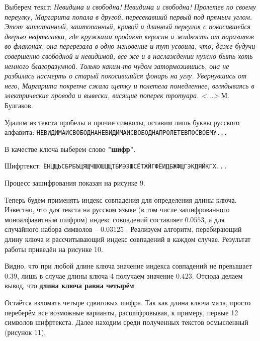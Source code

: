 Выберем текст: \textit{Невидима и свободна! Невидима и свободна! Пролетев по своему переулку, Маргарита попала в другой, пересекавший первый под прямым углом. Этот заплатанный, заштопанный, кривой и длинный переулок с покосившейся дверью нефтелавки, где кружками продают керосин и жидкость от паразитов во флаконах, она перерезала в одно мгновение и тут усвоила, что, даже будучи совершенно свободной и невидимой, все же и в наслаждении нужно быть хоть немного благоразумной. Только каким-то чудом затормозившись, она не разбилась насмерть о старый покосившийся фонарь на углу. Увернувшись от него, Маргарита покрепче сжала щетку и полетела помедленнее, вглядываясь в электрические провода и вывески, висящие поперек тротуара. <...>} М. Булгаков.

Удалим из текста пробелы и прочие символы, оставим лишь буквы русского алфавита: 
\verb|НЕВИДИМАИСВОБОДНАНЕВИДИМАИСВОБОДНАПРОЛЕТЕВПОСВОЕМУ...| 

В качестве ключа выберем слово {\bf "шифр"}. 

Шифртекст: \verb|ЁНЦЩЬСБРБЪЦЯЩЧШЮШЦЩТБМЭЭШСЁТЖЙГФЁИДБЖФЩГЭКДЯЙКГХ...|

Процесс зашифрования показан на рисунке 9.

Теперь будем применять индекс совпадения для определения длины ключа. Известно, что для текста на русском языке (в том числе зашифрованного моноалфавитным шифром) индекс совпадений составляет $0.0553$, а для случайного набора символов – $0.03125$ \cite{wiki:index_of_coincidence}. Реализуем алгоритм, перебирающий длину ключа и рассчитывающий индекс совпадений в каждом случае. Результат работы приведён на рисунке 10.


Видно, что при любой длине ключа значение индекса совпадений не превышает $0.39$, лишь в случае длины ключа 4 получаем значение $0.423$. Отсюда делаем вывод, что {\bf длина ключа равна четырём}. 

Остаётся взломать четыре сдвиговых шифра. Так как длина ключа мала, просто переберём все возможные варианты, расшифровывая, к примеру, первые 12 символов шифртекста. Далее находим среди полученных текстов осмысленный (рисунок 11).  

